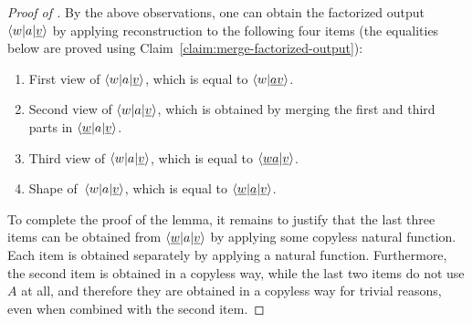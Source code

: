 \begin{proof}[Proof of ]
\tito{}
    By the above observations, one can obtain the factorized output $\langle w|a|\underline v \rangle$ by applying reconstruction to the  following four items (the equalities below are proved using  Claim~\ref{claim:merge-factorized-output}):
     \begin{enumerate}
        \item \label{it:first-view}First view of $\langle w|a|\underline v \rangle$, which is equal to $\langle w|\underline {av} \rangle$.
        \item  \label{it:second-view} Second view of $\langle w|a|\underline v \rangle$, which is obtained by merging the first and third parts in $\langle \underline w|a|\underline v \rangle$.
        \item \label{it:third-view}   Third view of $\langle w|a|\underline v \rangle$, which is equal to $\langle \underline {wa}|\underline{v} \rangle$.
        \item   \label{it:shape} Shape of~$\langle w|a|\underline v \rangle$, which is equal to $\langle \underline w|\underline a| \underline v \rangle$.
     \end{enumerate}
     To complete the proof of the lemma, it remains to justify that the last three items can be obtained from $\langle \underline w|a|\underline v \rangle$ by applying some copyless natural function. Each item is obtained separately by applying a natural function. Furthermore, the second item is obtained in a copyless way, while the last two items do not use $A$ at all, and therefore they are obtained in a copyless way for trivial reasons, even when combined with the second item.
\end{proof}


